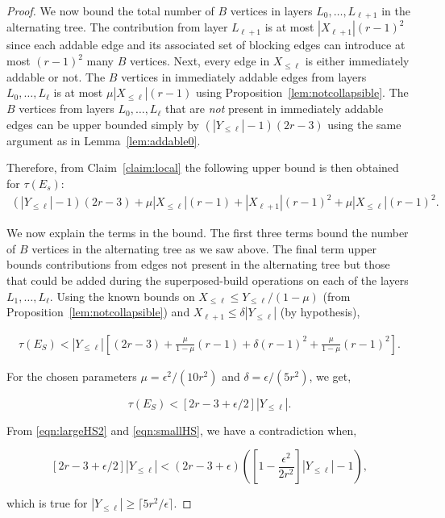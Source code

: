 \documentclass[11pt]{article}
\theoremstyle{definition}
\theoremstyle{remark}
\begin{document}
\begin{proof}
We now bound the total number of $B$ vertices in layers
$L_0,\dots,L_{\ell+1}$ in the alternating tree. The contribution from
layer $L_{\ell+1}$ is at most $|X_{\ell+1}|(r-1)^2$ since each addable
edge and its associated set of blocking edges can introduce at most
$(r-1)^2$ many $B$ vertices. Next, every edge in $X_{\leq \ell}$ is
either immediately addable or not. The $B$ vertices in immediately
addable edges from layers $L_0,\dots,L_\ell$ is at most $\mu|X_{\leq
  \ell}|(r-1)$ using Proposition~\ref{lem:notcollapsible}. The $B$
vertices from layers $L_0,\dots,L_\ell$ that are \emph{not} present in
immediately addable edges can be upper bounded simply by $(|Y_{\leq
  \ell}|-1)(2r-3)$ using the same argument as in Lemma~\ref{lem:addable0}.

Therefore, from Claim~\ref{claim:local} the following upper bound is then obtained for $\tau(E_s)$:
\begin{align*}
 (|Y_{\leq \ell}|-1)(2r-3) + \mu|X_{\leq \ell}|(r-1) + |X_{\ell+1}|(r-1)^2 + \mu |X_{\leq \ell}| (r-1)^2.
\end{align*}

We now explain the terms in the bound. The first three terms bound the number of $B$ vertices in the alternating tree as we saw above. The final term upper bounds contributions from edges not present in the alternating tree but those that could be added during the superposed-build operations on each of the layers $L_1,\dots,L_\ell$. Using the known bounds on $X_{\leq \ell} \leq Y_{\leq \ell}/(1-\mu)$ (from Proposition~\ref{lem:notcollapsible}) and $X_{\ell+1} \leq \delta |Y_{\leq \ell}|$ (by hypothesis),

\begin{align*}
\tau(E_S) < |Y_{\leq \ell}| \left[ (2r-3) + \frac{\mu}{1-\mu} \right. (r-1) + \delta(r-1)^2 + \left. \frac{\mu}{1-\mu}(r-1)^2 \right].
\end{align*}

For the chosen parameters $\mu = \epsilon^2/(10r^2)$ and $\delta=\epsilon/(5r^2)$, we get,

\begin{equation}\label{eqn:smallHS}
\tau(E_S) < \left[ 2r-3 + \epsilon/2\right]|Y_{\leq \ell}|.
\end{equation}

From \eqref{eqn:largeHS2} and \eqref{eqn:smallHS}, we have a contradiction when,


\[ \left[2r-3 + \epsilon/2 \right]|Y_{\leq \ell}| <  (2r-3+\epsilon)\left(\left[1 - \frac{\epsilon^2}{2r^2}\right] |Y_{\leq \ell}|-1\right),\]

which is true for $|Y_{\leq \ell}| \geq \lceil 5r^2/\epsilon \rceil$.
\end{proof}
\end{document}
